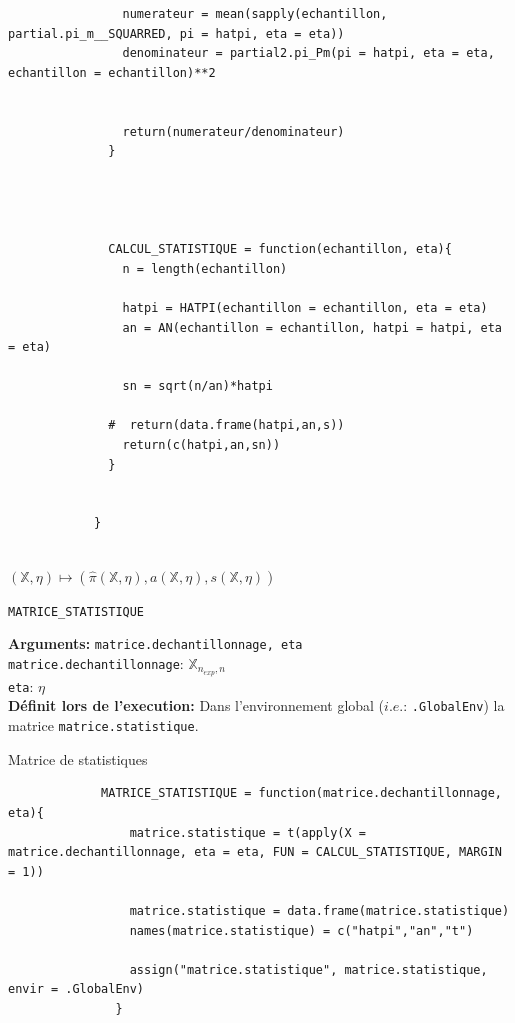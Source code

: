 \documentclass{article}
\newenvironment{fonction}[1][htb]
  {\renewcommand{\algorithmcfname}{Fonction}%
   \begin{algorithm}[#1]%
  }{\end{algorithm}}
\begin{document}
\begin{script}
\begin{verbatim}
                numerateur = mean(sapply(echantillon, partial.pi_m__SQUARRED, pi = hatpi, eta = eta))
                denominateur = partial2.pi_Pm(pi = hatpi, eta = eta, echantillon = echantillon)**2
                
                
                return(numerateur/denominateur)
              }
              
              
              
              
              CALCUL_STATISTIQUE = function(echantillon, eta){
                n = length(echantillon)
              
                hatpi = HATPI(echantillon = echantillon, eta = eta)
                an = AN(echantillon = echantillon, hatpi = hatpi, eta = eta)
              
                sn = sqrt(n/an)*hatpi
              
              #  return(data.frame(hatpi,an,s))
                return(c(hatpi,an,sn))
              }
              

            }
            
        \end{verbatim}
    \end{script}

    \begin{center}
        $ (\mathbb{X},\eta) \longmapsto (\hat\pi(\mathbb{X},\eta),a(\mathbb{X},\eta),s(\mathbb{X},\eta)) $
    \end{center}


    \begin{fonction}[h]
        \caption{\texttt{MATRICE\_STATISTIQUE}}
        \textbf{Arguments:} \texttt{matrice.dechantillonnage, eta} \\
         \texttt{matrice.dechantillonnage}: $\mathbb{X}_{n_{exp},n}$ \\
         \texttt{eta}: $\eta$ \\
         \textbf{Définit lors de l'execution:} Dans l'environnement global ($i.e.$: \texttt{.GlobalEnv}) la matrice \texttt{matrice.statistique}.
     \end{fonction}
 
     \begin{script}[t]
         \caption{Matrice de statistiques}
         \begin{verbatim}
             MATRICE_STATISTIQUE = function(matrice.dechantillonnage, eta){
                 matrice.statistique = t(apply(X = matrice.dechantillonnage, eta = eta, FUN = CALCUL_STATISTIQUE, MARGIN = 1))
                 
                 matrice.statistique = data.frame(matrice.statistique)
                 names(matrice.statistique) = c("hatpi","an","t")
                 
                 assign("matrice.statistique", matrice.statistique, envir = .GlobalEnv) 
               }
         \end{verbatim}
     \end{script}
 
\end{document}
